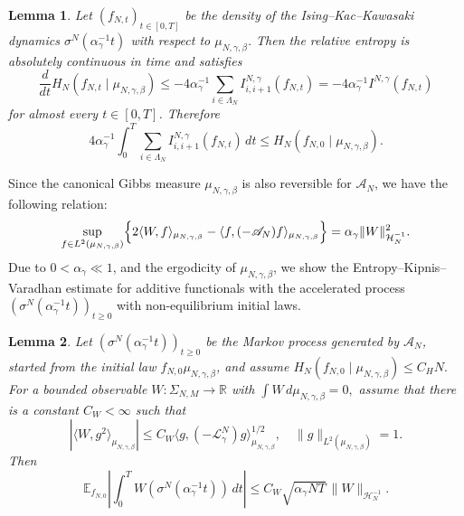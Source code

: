 \documentclass{article}
\newtheorem{lemma}{Lemma}
\begin{document}
\begin{lemma}\label{lem:entropy-dissipation-kawasaki}
Let \((f_{N,t})_{t\in[0,T]}\) be the density of the Ising--Kac--Kawasaki dynamics $\sigma^N(\alpha^{-1}_{\gamma}t)$ with respect to \(\mu_{N,\gamma,\beta}\). 
Then the relative entropy is absolutely continuous in time and satisfies
\[
\frac{d}{dt}H_N(f_{N,t}\mid \mu_{N,\gamma,\beta})
\le
-4\alpha^{-1}_{\gamma}\sum_{i\in\Lambda_N} I_{i,i+1}^{N,\gamma}(f_{N,t})
=
-4\alpha^{-1}_{\gamma} I^{N,\gamma}(f_{N,t})
\]
for almost every \(t\in[0,T]\). Therefore
\[
4\alpha^{-1}_{\gamma}\int_0^T \sum_{i\in\Lambda_N} I_{i,i+1}^{N,\gamma}(f_{N,t})\,dt
\le
H_N(f_{N,0}\mid \mu_{N,\gamma,\beta}).
\]
\end{lemma}

Since the canonical Gibbs measure \(\mu_{N,\gamma,\beta}\) is also reversible for \(\mathscr A_N\), we have the following relation:
\begin{equation}\label{eq:varH-1}
    \sup_{f \in L^2(\mu_{N,\gamma,\beta})}
\Bigl\{
2\langle W,f\rangle_{\mu_{N,\gamma,\beta}}
-
\langle f,(-\mathscr A_N)f\rangle_{\mu_{N,\gamma,\beta}}
\Bigr\} = \alpha_{\gamma}\|W\|_{\mathcal{H}^{-1}_N}^2.
\end{equation}
Due to $0 <\alpha_{\gamma} \ll 1$, and the ergodicity of $\mu_{N,\gamma,\beta}$, we show the Entropy--Kipnis--Varadhan estimate for additive functionals with the accelerated process \((\sigma^N(\alpha_\gamma^{-1}t))_{t\ge0}\) with non-equilibrium initial laws.



\begin{lemma}\label{lem:entropy-KV}
Let \((\sigma^N(\alpha_\gamma^{-1}t))_{t\ge0}\) be the Markov process generated by \(\mathscr A_N\), started from the initial law \(f_{N,0}\mu_{N,\gamma,\beta}\), and assume
\(
H_N(f_{N,0}\mid \mu_{N,\gamma,\beta})\le C_H N.
\)
For a bounded observable \(W:\Sigma_{N,M}\to\mathbb R\) with
\(
\int W\,d\mu_{N,\gamma,\beta}=0,
\)
assume that there is a constant \(C_W <\infty\) such that
\begin{equation}\label{eq:entropy-KV-density-Hminus1}
    |\langle W,g^2\rangle_{\mu_{N,\gamma,\beta}}|
\le C_W \langle g,(-\mathscr L_\gamma^N)g\rangle_{\mu_{N,\gamma,\beta}}^{1/2}, \quad \|g\|_{L^2(\mu_{N,\gamma,\beta})}=1.
\end{equation}
Then
\begin{equation}\label{E:KLnonq}
    \mathbb E_{f_{N,0}}
\left|
\int_0^T W(\sigma^N(\alpha_\gamma^{-1}t))\,dt
\right| 
\le
C_W\sqrt{\alpha_{\gamma}NT}\,\|W\|_{\mathcal{H}^{-1}_N}. 
\end{equation}
\end{lemma}
\end{document}
